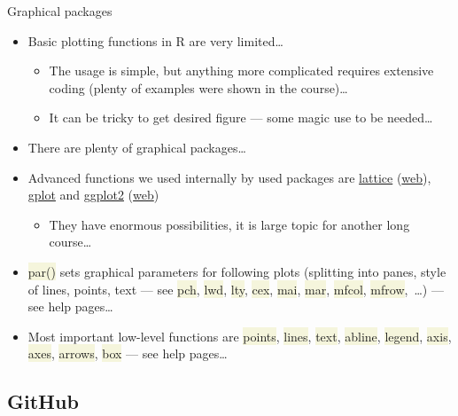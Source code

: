\documentclass[compress, ucs, xelatex, 11pt, xcolor=svgnames, aspectratio=169,
	hyperref={
		bookmarks=true,
		unicode=true,
		colorlinks=true,
		pdftitle={Molecular data in R},
		plainpages=false,
		pdfauthor={Vojtech Zeisek},
		pdfsubject={Course about phylogeny and evolution in R},
		pdfcreator={XeLaTeX},
		pdfkeywords={R, evolution, phylogeny, molecular data},
		linkcolor=Crimson, %
		anchorcolor=Magenta, %
		citecolor=Magenta, %
		filecolor=Magenta, %
		menucolor=Magenta, %
		urlcolor=DodgerBlue, %
		pdftex},
	url={hyphens, lowtilde} %
	]{beamer}
\renewcommand{\texttt}[1]{\colorbox{Beige}{{\ttfamily #1}}}
\begin{document}
\begin{frame}{Graphical packages}
	\begin{itemize}
		\item Basic plotting functions in R are very limited\ldots
		\begin{itemize}
			\item The usage is simple, but anything more complicated requires extensive coding (plenty of examples were shown in the course)\ldots
			\item It can be tricky to get desired figure --- some magic use to be needed\ldots
		\end{itemize}
		\item There are plenty of graphical packages\ldots
		\item Advanced functions we used internally by used packages are \href{https://CRAN.R-project.org/package=lattice}{lattice} (\href{https://lattice.r-forge.r-project.org/}{web}), \href{https://CRAN.R-project.org/package=gplots}{gplot} and \href{https://CRAN.R-project.org/package=ggplot2}{ggplot2} (\href{https://ggplot2.tidyverse.org/}{web})
		\begin{itemize}
			\item They have enormous possibilities, it is large topic for another long course\ldots
		\end{itemize}
		\item \texttt{par()} sets graphical parameters for following plots (splitting into panes, style of lines, points, text --- see \texttt{pch}, \texttt{lwd}, \texttt{lty}, \texttt{cex}, \texttt{mai}, \texttt{mar}, \texttt{mfcol}, \texttt{mfrow},~\ldots) --- see help pages\ldots
		\item Most important low-level functions are \texttt{points}, \texttt{lines}, \texttt{text}, \texttt{abline}, \texttt{legend}, \texttt{axis}, \texttt{axes}, \texttt{arrows}, \texttt{box} --- see help pages\ldots
	\end{itemize}
\end{frame}

\subsection{GitHub}
\end{document}
